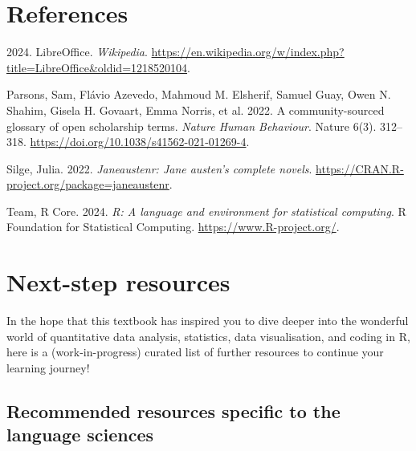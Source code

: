 \documentclass[
  letterpaper,
  DIV=11,
  numbers=noendperiod,
  oneside]{scrreprt}
\newlength{\cslhangindent}
\newenvironment{CSLReferences}[2] %
 {\begin{list}{}{%
  \setlength{\itemindent}{0pt}
  \setlength{\leftmargin}{0pt}
  \setlength{\parsep}{0pt}
  \ifodd #1
   \setlength{\leftmargin}{\cslhangindent}
   \setlength{\itemindent}{-1\cslhangindent}
  \fi
  \setlength{\itemsep}{#2\baselineskip}}}
 {\end{list}}
\begin{document}
\chapter*{References}\label{references}


\label{refs}
\begin{CSLReferences}{1}{0}
2024. LibreOffice. \emph{Wikipedia}.
\url{https://en.wikipedia.org/w/index.php?title=LibreOffice&oldid=1218520104}.

Parsons, Sam, Flávio Azevedo, Mahmoud M. Elsherif, Samuel Guay, Owen N.
Shahim, Gisela H. Govaart, Emma Norris, et al. 2022. A community-sourced
glossary of open scholarship terms. \emph{Nature Human Behaviour}.
Nature 6(3). 312--318. \url{https://doi.org/10.1038/s41562-021-01269-4}.

Silge, Julia. 2022. \emph{Janeaustenr: Jane austen's complete novels}.
\url{https://CRAN.R-project.org/package=janeaustenr}.

Team, R Core. 2024. \emph{R: A language and environment for statistical
computing}. R Foundation for Statistical Computing.
\url{https://www.R-project.org/}.

\end{CSLReferences}

\cleardoublepage
{}
{}
\appendix

\chapter{Next-step resources}\label{next-step-resources}

In the hope that this textbook has inspired you to dive deeper into the
wonderful world of quantitative data analysis, statistics, data
visualisation, and coding in R, here is a (work-in-progress) curated
list of further resources to continue your learning journey! 🚀✨

\section{Recommended resources specific to the language
sciences}\label{recommended-resources-specific-to-the-language-sciences}
\end{document}

